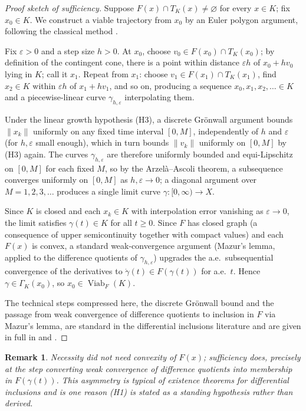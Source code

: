 \documentclass[11pt]{report}
\newtheorem{remark}{Remark}[chapter]
\begin{document}
\begin{proof}[Proof sketch of sufficiency]
Suppose $F(x) \cap T_K(x) \neq \varnothing$ for every $x \in K$; fix
$x_0 \in K$. We construct a viable trajectory from $x_0$ by an Euler
polygon argument, following the classical method \cite{aubin1991}.

Fix $\varepsilon > 0$ and a step size $h > 0$. At $x_0$, choose
$v_0 \in F(x_0) \cap T_K(x_0)$; by definition of the contingent cone,
there is a point within distance $\varepsilon h$ of $x_0 + h v_0$
lying in $K$; call it $x_1$. Repeat from $x_1$: choose
$v_1 \in F(x_1) \cap T_K(x_1)$, find $x_2 \in K$ within $\varepsilon h$
of $x_1 + h v_1$, and so on, producing a sequence $x_0, x_1, x_2, \dots
\in K$ and a piecewise-linear curve $\gamma_{h,\varepsilon}$ interpolating
them.

Under the linear growth hypothesis (H3), a discrete Gr\"onwall argument
bounds $\|x_k\|$ uniformly on any fixed time interval $[0,M]$,
independently of $h$ and $\varepsilon$ (for $h,\varepsilon$ small
enough), which in turn bounds $\|v_k\|$ uniformly on $[0,M]$ by (H3)
again. The curves $\gamma_{h,\varepsilon}$ are therefore uniformly
bounded and equi-Lipschitz on $[0,M]$ for each fixed $M$, so by the
Arzel\`a--Ascoli theorem, a subsequence converges uniformly on $[0,M]$
as $h, \varepsilon \to 0$; a diagonal argument over $M = 1,2,3,\dots$
produces a single limit curve $\gamma : [0,\infty) \to X$.

Since $K$ is closed and each $x_k \in K$ with interpolation error
vanishing as $\varepsilon \to 0$, the limit satisfies $\gamma(t) \in K$
for all $t \geq 0$. Since $F$ has closed graph (a consequence of upper
semicontinuity together with compact values) and each $F(x)$ is convex,
a standard weak-convergence argument (Mazur's lemma, applied to the
difference quotients of $\gamma_{h,\varepsilon}$) upgrades the a.e.\
subsequential convergence of the derivatives to
$\dot\gamma(t) \in F(\gamma(t))$ for a.e.\ $t$. Hence
$\gamma \in \Gamma_K(x_0)$, so $x_0 \in \operatorname{Viab}_F(K)$.

The technical steps compressed here, the discrete Gr\"onwall bound and
the passage from weak convergence of difference quotients to inclusion
in $F$ via Mazur's lemma, are standard in the differential inclusions
literature and are given in full in \cite{aubincellina1984} and
\cite{aubinframkowska1990}.
\end{proof}

\begin{remark}
Necessity did not need convexity of $F(x)$; sufficiency does, precisely
at the step converting weak convergence of difference quotients into
membership in $F(\gamma(t))$. This asymmetry is typical of existence
theorems for differential inclusions and is one reason (H1) is stated
as a standing hypothesis rather than derived.
\end{remark}
\end{document}
